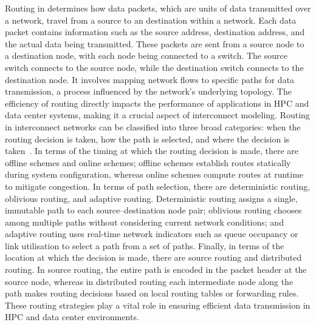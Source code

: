 Routing in determines how data packets, which are units of data transmitted over a network, travel from a source to an destination within a network. Each data packet contains information such as the source address, destination address, and the actual data being transmitted. These packets are sent from a source node to a destination node, with each node being connected to a switch. The source switch connects to the source node, while the destination switch connects to the destination node. It involves mapping network flows to specific paths for data transmission, a process influenced by the network's underlying topology. The efficiency of routing directly impacts the performance of applications in HPC and data center systems, making it a crucial aspect of interconnect modeling.
Routing in interconnect networks can be classified into three broad categories: when the routing decision is taken, how the path is selected, and where the decision is taken~\cite{scheideler2006universal, dally2004principles}. In terms of the timing at which the routing decision is made, there are offline schemes and online schemes; offline schemes establish routes statically during system configuration, whereas online schemes compute routes at runtime to mitigate congestion. In terms of path selection, there are deterministic routing, oblivious routing, and adaptive routing. Deterministic routing assigns a single, immutable path to each source–destination node pair; oblivious routing chooses among multiple paths without considering current network conditions; and adaptive routing uses real-time network indicators such as queue occupancy or link utilisation to select a path from a set of paths. Finally, in terms of the location at which the decision is made, there are source routing and distributed routing. In source routing, the entire path is encoded in the packet header at the source node, whereas in distributed routing each intermediate node along the path makes routing decisions based on local routing tables or forwarding rules.
These routing strategies play a vital role in ensuring efficient data transmission in HPC and data center environments.


